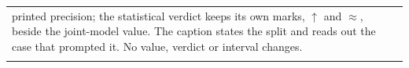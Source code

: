 \begin{table}[htb]
\begin{tabular}{@{}p{}p{}@{}}
printed precision; the statistical verdict keeps its own marks, $\uparrow$ and $\approx$,
beside the joint-model value. The caption states the split and reads out the case that
prompted it. No value, verdict or interval changes. \\
\addlinespace

\end{tabular}
\end{table}
